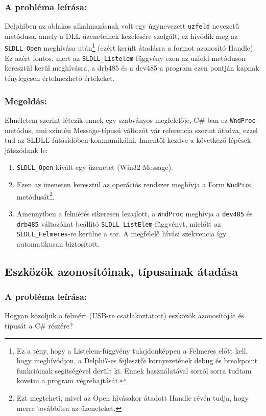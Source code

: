 \documentclass[tocnopagenum]{thesis-ekf}
\theoremstyle{definition}
\theoremstyle{remark}
\begin{document}
	\subsubsection{A probléma leírása:} Delphiben az ablakos alkalmazásnak volt egy úgynevezett \verb*|uzfeld| nevezetű metódusa, amely a DLL üzeneteinek kezelésére szolgált, ez hívódik meg az \verb*|SLDLL_Open| meghívása után\footnote{Ez a tény, hogy a Listelem-függvény tulajdonképpen a Felmeres előtt kell, hogy meghívódjon, a Delphi7-es fejlesztői környezetének debug és breakpoint funkcióinak segítségével derült ki. Ennek használatával sorról sorra tudtam követni a program végrehajtását.} (ezért került átadásra a formot azonosító Handle). Ez azért fontos, mert az \verb*|SLDLL_Listelem|-függvény ezen az uzfeld-metóduson keresztül kerül meghívásra, a drb485 és a dev485 a program ezen pontján kapnak ténylegesen értelmezhető értékeket.
	\subsubsection{Megoldás:}
	\label{wndproc}
	Elméletem szerint létezik ennek egy szabványos megfelelője, C\#-ban ez \verb*|WndProc|-metódus, ami szintén Message-típusú változót vár referencia szerint átadva, ezzel tud az SLDLL futásidőben kommunikálni.
	Innentől kezdve a következő lépések játszódnak le:
	\begin{enumerate}
		\item \verb*|SLDLL_Open| kivált egy üzenetet (Win32 Message).
		\item Ezen az üzeneten keresztül az operációs rendszer meghívja a Form \verb*|WndProc| metódusát\footnote{Ezt megteheti, mivel az Open hívásakor átadott Handle révén tudja, hogy merre továbbítsa az üzeneteket.}.
		\item Amennyiben a felmérés sikeresen lezajlott, a \verb*|WndProc| meghívja a \verb*|dev485| és \verb*|drb485| változókat beállító \verb*|SLDLL_ListElem|-függvényt, mielőtt az \verb*|SLDLL_Felmeres|-re kerülne a sor. A megfelelő hívási szekvencia így automatikusan biztosított.
	\end{enumerate}
	\subsection{Eszközök azonosítóinak, típusainak átadása}
	\subsubsection{A probléma leírása:} Hogyan közöljük a felmért (USB-re csatlakoztatott) eszközök azonosítóját és típusát a C\# részére?
\end{document}
